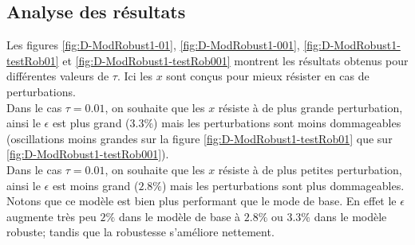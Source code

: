 \subsection{Analyse des résultats}
Les figures \ref{fig:D-ModRobust1-01}, \ref{fig:D-ModRobust1-001}, \ref{fig:D-ModRobust1-testRob01} et \ref{fig:D-ModRobust1-testRob001} montrent les résultats obtenus pour différentes valeurs de $\tau$. Ici les $x$ sont conçus pour mieux résister en cas de perturbations. \\
Dans le cas $\tau = 0.01$, on souhaite que les $x$ résiste à de plus grande perturbation, ainsi le $\epsilon$ est plus grand ($3.3 \%$) mais les perturbations sont moins dommageables (oscillations moins grandes sur la figure \ref{fig:D-ModRobust1-testRob01} que sur \ref{fig:D-ModRobust1-testRob001}).\\
Dans le cas $\tau = 0.01$, on souhaite que les $x$ résiste à de plus petites perturbation, ainsi le $\epsilon$ est moins grand ($2.8 \%$) mais les perturbations sont plus dommageables.\\
Notons que ce modèle est bien plus performant que le mode de base. En effet le $\epsilon$ augmente très peu $2\%$ dans le modèle de base à $2.8\%$ ou $3.3\%$ dans le modèle robuste; tandis que la robustesse s'améliore nettement.

